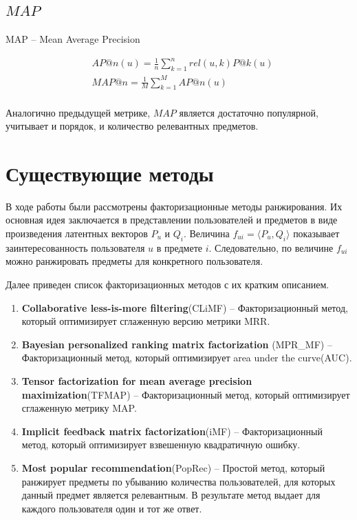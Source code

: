 \documentclass[14pt]{extarticle}
\begin{document}
\subsection{$MAP$}
	MAP -- 	Mean Average Precision
	
	\begin{equation*}
	\begin{split}
	 & AP@n(u) = \frac{1}{n}\sum_{k=1}^n rel(u, k) P@k(u)  \\
	 & MAP@n = \frac{1}{M}\sum_{k=1}^M AP@n(u) \\
	\end{split}			
	\end{equation*}
	
	Аналогично предыдущей метрике, $MAP$ является достаточно популярной, учитывает и порядок, и количество релевантных предметов.
	
	

\section{Существующие методы}
В ходе работы были рассмотрены факторизационные методы ранжирования. Их основная идея заключается в представлении пользователей и предметов в виде произведения латентных векторов $P_u$ и $Q_i$. Величина $f_{ui} = \langle P_u, Q_i\rangle$  показывает заинтересованность пользователя $u$ в предмете  $i$. Следовательно, по величине $f_{ui}$ можно ранжировать предметы для конкретного пользователя.
	
Далее приведен список факторизационных методов с их кратким описанием.  
\begin{enumerate}
\item \textbf{Collaborative less-is-more filtering}(CLiMF) --
  Факторизационный метод, который оптимизирует сглаженную версию метрики MRR.\cite{climf}
  	
\item\textbf{Bayesian personalized ranking matrix factorization} (MPR\_MF) -- 
  Факторизационный метод, который оптимизирует area under the curve(AUC).\cite{bprmp}
  
\item \textbf{Tensor factorization for mean average precision maximization}(TFMAP) --
   Факторизационный метод, который оптимизирует сглаженную метрику MAP.\cite{tfmap}

\item \textbf{Implicit feedback matrix factorization}(iMF) --
	Факторизационный метод, который оптимизирует взвешенную квадратичную ошибку.\cite{imf} 

\item \textbf{Most popular recommendation}(PopRec) --
    Простой метод, который ранжирует предметы по убыванию количества пользователей, для которых данный предмет является релевантным. В результате метод выдает для каждого пользователя один  и тот же ответ.
\end{enumerate}
\end{document}
